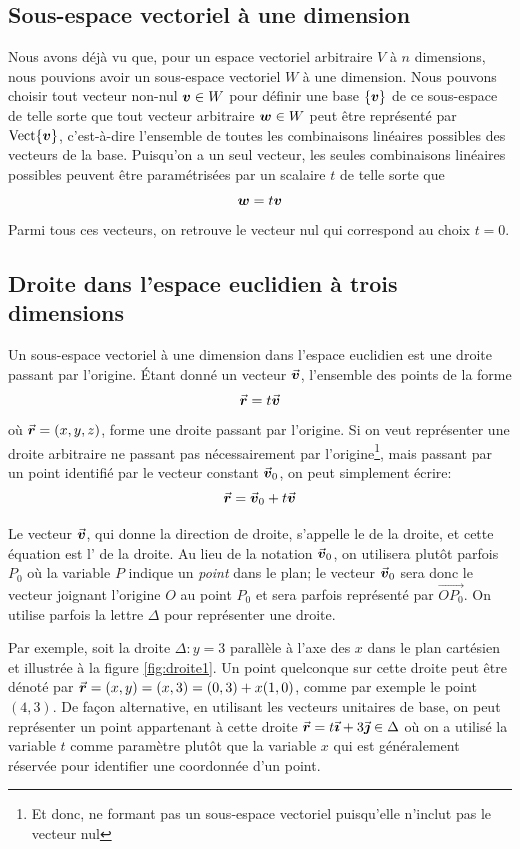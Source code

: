 \subsection{Sous-espace vectoriel à une dimension}

Nous avons déjà vu que, pour un espace vectoriel arbitraire $V$ à $n$ dimensions, nous pouvions
avoir un sous-espace vectoriel $W$ à une dimension.  Nous pouvons choisir tout vecteur non-nul 
$\boldsymbol{v} \in W$ pour définir une base $\{\boldsymbol{v}\}$ de ce sous-espace de telle sorte que
tout vecteur arbitraire $\boldsymbol{w}\in W$ peut être représenté par $\operatorname{Vect}\{\boldsymbol{v}\}$, c'est-à-dire
l'ensemble de toutes les combinaisons linéaires possibles des vecteurs de la base.  
Puisqu'on a un seul vecteur, les seules combinaisons linéaires possibles peuvent être
paramétrisées par un scalaire $t$ de telle sorte que
\[
\boldsymbol{w} = t\boldsymbol{v}
\]
Parmi tous ces vecteurs, on retrouve le vecteur nul qui correspond au choix $t=0$.

\subsection{Droite dans l'espace euclidien à trois dimensions}

Un sous-espace vectoriel à une dimension dans l'espace euclidien est une droite passant par l'origine.
Étant donné un vecteur $\vec{\boldsymbol{v}}$, l'ensemble des points de la forme
\[
\vec{\boldsymbol{r}} = t \vec{\boldsymbol{v}}
\]
où $\vec{\boldsymbol{r}} = (x, y, z)$, forme une droite passant par l'origine.  Si on veut représenter une droite arbitraire
ne passant pas nécessairement par l'origine\footnote{Et donc, ne formant pas un sous-espace vectoriel puisqu'elle
n'inclut pas le vecteur nul}, mais passant par un point identifié par le vecteur constant 
$\vec{\boldsymbol{v}}_0$, on peut simplement écrire:
 \[
 \vec{\boldsymbol{r}} = \vec{\boldsymbol{v}}_0 + t \vec{\boldsymbol{v}}
 \]

Le vecteur $\vec{\boldsymbol{v}}$, qui donne la direction de droite, s'appelle le 
de la droite, et cette équation est l' de la droite.
Au lieu de la notation $\vec{\boldsymbol{v}}_0$, on utilisera plutôt parfois $P_0$ où la variable $P$
indique un \textit{point} dans le plan; le vecteur $\vec{\boldsymbol{v}}_0$ sera donc le vecteur 
joignant l'origine $O$ au point $P_0$ et sera parfois représenté par $\overrightarrow{OP_0}$.
On utilise parfois la lettre $\Delta$ pour représenter une droite.

Par exemple, soit la droite $\Delta: y=3$ parallèle à l'axe des $x$ dans le plan cartésien et 
illustrée à la figure \ref{fig:droite1}.
Un point quelconque sur cette droite peut être dénoté par $\vec{\boldsymbol{r}} = (x,y) = (x, 3) = (0, 3) + x(1, 0)$, 
comme par exemple le point $(4,3)$.  De façon alternative, en utilisant les vecteurs unitaires
de base, on peut représenter un point appartenant à cette droite  $\vec{\boldsymbol{r}} =  t\vec{\boldsymbol{\imath}} + 3\vec{\boldsymbol{\jmath}} \in \Delta$
où on a utilisé la variable $t$ comme paramètre plutôt que la variable $x$ qui est généralement
réservée pour identifier une coordonnée d'un point.

